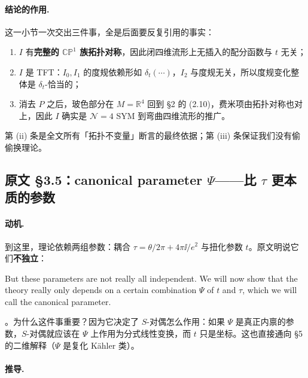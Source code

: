 \paragraph{结论的作用.}
这一小节一次交出三件事，全是后面要反复引用的事实：
\begin{enumerate}[label=(\roman*)]
\item $I$ 有\textbf{完整的 $\mathbb{CP}^1$ 族拓扑对称}，因此闭四维流形上无插入的配分函数与 $t$ 无关\pA{}；
\item $I$ 是 TFT：$I_0,I_1$ 的度规依赖形如 $\delta_t(\cdots)$，$I_2$ 与度规无关，所以度规变化整体是 $\delta_t$-恰当的\pA{}；
\item 消去 $P$ 之后，玻色部分在 $M=\mathbb R^4$ 回到 §2 的 (2.10)，费米项由拓扑对称也对上，因此 $I$ 确实是 $\mathcal N=4$ SYM 到弯曲四维流形的推广\pA{}。
\end{enumerate}
第 (ii) 条是全文所有「拓扑不变量」断言的最终依据；第 (iii) 条保证我们没有偷偷换理论。


\subsection{原文 §3.5：canonical parameter $\Psi$——比 $\tau$ 更本质的参数}

\paragraph{动机.}
到这里，理论依赖两组参数：耦合 $\tau=\theta/2\pi+4\pi\ii/e^2$ 与扭化参数 $t$。原文明说它们\textbf{不独立}：
\begin{origquote}
But these parameters are not really all independent. We will now show that the theory really only depends on a certain combination $\Psi$ of $t$ and $\tau$, which we will call the canonical parameter.
\end{origquote}
\noindent{}。为什么这件事重要？因为它决定了 $S$-对偶怎么作用：如果 $\Psi$ 是真正内禀的参数，$S$-对偶就应该在 $\Psi$ 上作用为分式线性变换，而 $t$ 只是坐标。这也直接通向 §5 的二维解释（$\Psi$ 是复化 Kähler 类）。

\paragraph{推导.}

